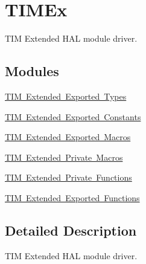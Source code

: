 \hypertarget{group___t_i_m_ex}{}\section{T\+I\+M\+Ex}
\label{group___t_i_m_ex}


T\+IM Extended H\+AL module driver.  


\subsection*{Modules}
\begin{DoxyCompactItemize}
\item 
\mbox{\hyperlink{group___t_i_m_ex___exported___types}{T\+I\+M Extended Exported Types}}
\item 
\mbox{\hyperlink{group___t_i_m_ex___exported___constants}{T\+I\+M Extended Exported Constants}}
\item 
\mbox{\hyperlink{group___t_i_m_ex___exported___macros}{T\+I\+M Extended Exported Macros}}
\item 
\mbox{\hyperlink{group___t_i_m_ex___private___macros}{T\+I\+M Extended Private Macros}}
\item 
\mbox{\hyperlink{group___t_i_m_ex___private___functions}{T\+I\+M Extended Private Functions}}
\item 
\mbox{\hyperlink{group___t_i_m_ex___exported___functions}{T\+I\+M Extended Exported Functions}}
\end{DoxyCompactItemize}


\subsection{Detailed Description}
T\+IM Extended H\+AL module driver. 

